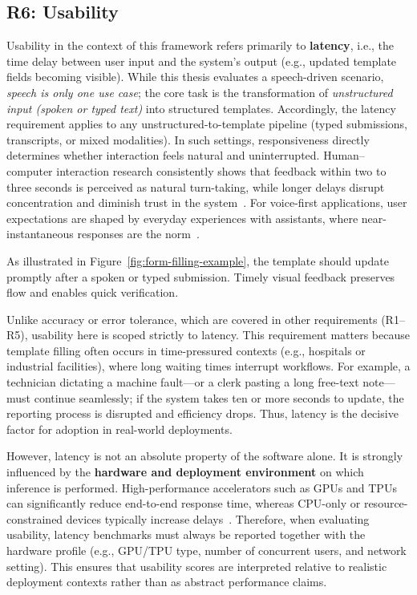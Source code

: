 \subsection*{R6: Usability}

Usability in the context of this framework refers primarily to \textbf{latency}, i.e., the time delay between user input and the system’s output (e.g., updated template fields becoming visible). While this thesis evaluates a speech-driven scenario, \emph{speech is only one use case}; the core task is the transformation of \emph{unstructured input (spoken or typed text)} into structured templates. Accordingly, the latency requirement applies to any unstructured-to-template pipeline (typed submissions, transcripts, or mixed modalities). In such settings, responsiveness directly determines whether interaction feels natural and uninterrupted. Human–computer interaction research consistently shows that feedback within two to three seconds is perceived as natural turn-taking, while longer delays disrupt concentration and diminish trust in the system~\cite{shneiderman2016designing}. For voice-first applications, user expectations are shaped by everyday experiences with assistants, where near-instantaneous responses are the norm~\cite{wang2021slu}.

As illustrated in Figure~\ref{fig:form-filling-example}, the template should update promptly after a spoken or typed submission. Timely visual feedback preserves flow and enables quick verification.

Unlike accuracy or error tolerance, which are covered in other requirements (R1–R5), usability here is scoped strictly to latency. This requirement matters because template filling often occurs in time-pressured contexts (e.g., hospitals or industrial facilities), where long waiting times interrupt workflows. For example, a technician dictating a machine fault—or a clerk pasting a long free-text note—must continue seamlessly; if the system takes ten or more seconds to update, the reporting process is disrupted and efficiency drops. Thus, latency is the decisive factor for adoption in real-world deployments.

However, latency is not an absolute property of the software alone. It is strongly influenced by the \textbf{hardware and deployment environment} on which inference is performed. High-performance accelerators such as GPUs and TPUs can significantly reduce end-to-end response time, whereas CPU-only or resource-constrained devices typically increase delays~\cite{shneiderman2016designing, jurafsky2023slp}. Therefore, when evaluating usability, latency benchmarks must always be reported together with the hardware profile (e.g., GPU/TPU type, number of concurrent users, and network setting). This ensures that usability scores are interpreted relative to realistic deployment contexts rather than as abstract performance claims.

